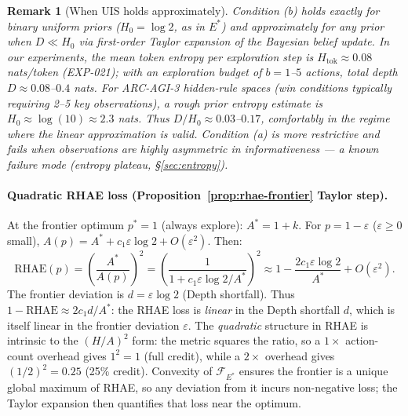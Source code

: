 \documentclass[11pt]{article}
\newtheorem{remark}{Remark}
\begin{document}
\begin{remark}[When UIS holds approximately]
Condition (b) holds \emph{exactly} for binary uniform priors ($H_0 = \log 2$, as in $E^*$) and \emph{approximately} for any prior when $D \ll H_0$ via first-order Taylor expansion of the Bayesian belief update. In our experiments, the mean token entropy per exploration step is $H_{\text{tok}} \approx 0.08$ nats/token (EXP-021); with an exploration budget of $b{=}1$--$5$ actions, total depth $D \approx 0.08$--$0.4$ nats. For ARC-AGI-3 hidden-rule spaces (win conditions typically requiring 2--5 key observations), a rough prior entropy estimate is $H_0 \approx \log(10) \approx 2.3$ nats. Thus $D/H_0 \approx 0.03$--$0.17$, comfortably in the regime where the linear approximation is valid. Condition (a) is more restrictive and fails when observations are highly asymmetric in informativeness --- a known failure mode (entropy plateau, \S\ref{sec:entropy}).
\end{remark}

\paragraph{Quadratic RHAE loss (Proposition~\ref{prop:rhae-frontier} Taylor step).} At the frontier optimum $p^*{=}1$ (always explore): $A^* = 1+k$. For $p = 1 - \varepsilon$ ($\varepsilon \geq 0$ small), $A(p) = A^* + c_1\varepsilon\log 2 + O(\varepsilon^2)$. Then:
\begin{equation}
\mathrm{RHAE}(p) = \left(\frac{A^*}{A(p)}\right)^2
= \left(\frac{1}{1 + c_1\varepsilon\log 2 / A^*}\right)^2
\approx 1 - \frac{2c_1\varepsilon\log 2}{A^*} + O(\varepsilon^2).
\end{equation}
The frontier deviation is $d = \varepsilon\log 2$ (Depth shortfall). Thus $1 - \mathrm{RHAE} \approx 2c_1 d / A^*$: the RHAE loss is \emph{linear} in the Depth shortfall $d$, which is itself linear in the frontier deviation $\varepsilon$. The \emph{quadratic} structure in RHAE is intrinsic to the $(H/A)^2$ form: the metric squares the ratio, so a $1\times$ action-count overhead gives $1^2 = 1$ (full credit), while a $2\times$ overhead gives $(1/2)^2 = 0.25$ (25\% credit). Convexity of $\mathcal{F}_{E^*}$ ensures the frontier is a unique global maximum of RHAE, so any deviation from it incurs non-negative loss; the Taylor expansion then quantifies that loss near the optimum.
\end{document}
